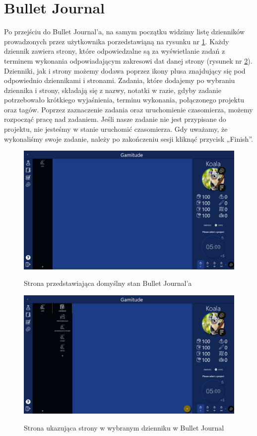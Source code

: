\documentclass[a4paper,11pt]{report}
\begin{document}
\section{Bullet Journal}
Po przejściu do Bullet Journal’a, na samym początku widzimy listę dzienników prowadzonych przez użytkownika porzedstawiąną na rysunku nr \ref{fig:Bullet}.
Każdy dziennik zawiera strony, które odpowiedzalne są za wyświetlanie zadań z terminem wykonania odpowiadającym zakresowi dat danej strony (rysunek nr \ref{fig:Bullet_pages}).
Dzienniki, jak i strony możemy dodawa poprzez ikony plusa znajdujący się pod odpowiednio dziennikami i stronami.
Zadania, które dodajemy po wybraniu dziennika i strony, składają się z nazwy, notatki w razie, gdyby zadanie potrzebowało krótkiego wyjaśnienia,
 terminu wykonania, połączonego projektu oraz tagów.
Poprzez zaznaczenie zadania oraz uruchomienie czasomierza, możemy rozpocząć pracę nad zadaniem.
Jeśli nasze zadanie nie jest przypisane do projektu, nie jesteśmy w stanie uruchomić czasomierza.
Gdy uważamy, że wykonaliśmy swoje zadanie, należy po zakończeniu sesji kliknąć przycisk „Finish”.
\begin{figure}[H]
	\centering
	\includegraphics[scale=0.3]{prezentacja/Bullet}\\
	\caption{Strona przedstawiająca domyślny stan Bullet Journal’a}
	\label{fig:Bullet}
\end{figure}
\begin{figure}[H]
	\centering
	\includegraphics[scale=0.3]{prezentacja/Bullet_pages}\\
	\caption{Strona ukazująca strony w wybranym dzienniku w Bullet Journal}
	\label{fig:Bullet_pages}
\end{figure}
\end{document}
